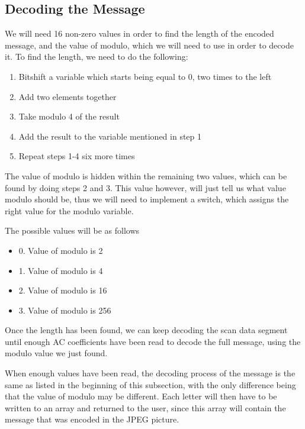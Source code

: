 \subsection{Decoding the Message}
We will need 16 non-zero values in order to find the length of the encoded message, and the value of modulo, which we will need to use in order to decode it. To find the length, we need to do the following:
\begin{enumerate}
	\item Bitshift a variable which starts being equal to 0, two times to the left
	\item Add two elements together
	\item Take modulo 4 of the result
	\item Add the result to the variable mentioned in step 1
	\item Repeat steps 1-4 six more times
\end{enumerate}
The value of modulo is hidden within the remaining two values, which can be found by doing steps 2 and 3. This value however, will just tell us what value modulo should be, thus we will need to implement a switch, which assigns the right value for the modulo variable.

The possible values will be as follows
\begin{itemize}
	\item 0. Value of modulo is 2
	\item 1. Value of modulo is 4
	\item 2. Value of modulo is 16
	\item 3. Value of modulo is 256
\end{itemize}
Once the length has been found, we can keep decoding the scan data segment until enough AC coefficients have been read to decode the full message, using the modulo value we just found.

When enough values have been read, the decoding process of the message is the same as listed in the beginning of this subsection, with the only difference being that the value of modulo may be different. 
Each letter will then have to be written to an array and returned to the user, since this array will contain the message that was encoded in the JPEG picture.